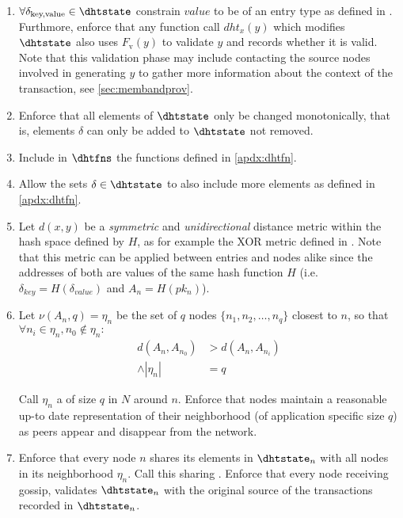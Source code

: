 \documentclass[twocolumn,showpacs,%
  nofootinbib,aps,superscriptaddress,%
  eqsecnum,prd,notitlepage,showkeys,10pt]{revtex4-1}
\begin{document}
\begin{enumerate}
\begin{enumerate}
\item $\forall \delta_\text{key,value} \in \dhtstate$ constrain $value$ to be of an entry type as defined in \hcdna.  Furthmore, enforce that any function call $dht_x(y)$ which modifies $\dhtstate$ also uses $F_\mathrm{v}(y)$ to validate $y$ and records whether it is valid.  Note that this validation phase may include contacting the source nodes involved in generating $y$ to gather more information about the context of the transaction, see \ref{sec:membandprov}.

\item Enforce that all elements of $\dhtstate$ only be changed monotonically, that is, elements $\delta$ can only be added to $\dhtstate$ not removed.

\item Include in $\dhtfns$ the functions defined in \ref{apdx:dhtfn}.

\item Allow the sets $\delta \in \dhtstate$ to also include more elements as defined in  \ref{apdx:dhtfn}.

\item Let $d(x,y)$ be a \textit{symmetric} and \textit{unidirectional} distance metric within the hash space defined by $H$, as for example the XOR metric defined in \cite{kademlia}. Note that this metric can be applied between entries and nodes alike since the addresses of both are values of the same hash function $H$ (i.e. $\delta_{key}=H(\delta_{value})$ and $A_n=H(pk_n)$).

\item Let $\nu(A_n,q)=\eta_n$ be the set of $q$ nodes $\{n_1,n_2,\dots,n_q\}$ closest to $n$, so that
$\forall n_i \in \eta_n, n_0 \notin \eta_n:$
\begin{equation}
\begin{split}
d(A_n,A_{n_0})& > d(A_n,A_{n_i})\\
\wedge \left\vert\eta_n\right\vert &= q
\end{split}
\end{equation}

Call $\eta_n$ a  of size $q$ in $N$ around $n$. Enforce that nodes maintain a reasonable up-to date representation of their neighborhood (of application specific size $q$) as peers appear and disappear from the network.

\item Enforce that every node $n$ shares its elements in $\dhtstate_n$ with all nodes in its neighborhood $\eta_n$. Call this sharing .  Enforce that every node receiving gossip, validates $\dhtstate_n$ with the original source of the transactions recorded in $\dhtstate_n$.


\end{enumerate}
\end{enumerate}
\end{document}
